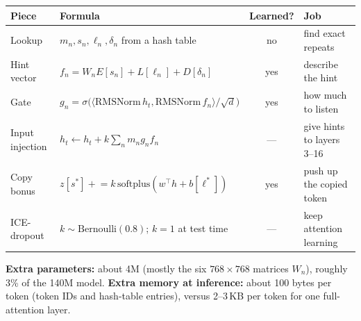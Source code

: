 \documentclass[11pt]{article}
\newcommand{\norm}{\mathrm{RMSNorm}}
\begin{document}
\begin{center}
\renewcommand{\arraystretch}{1.25}\small
\begin{tabular}{@{}llcl@{}}
\toprule
Piece & Formula & Learned? & Job \\
\midrule
Lookup & $m_n, s_n, \ell_n, \delta_n$ from a hash table & no & find exact repeats \\
Hint vector & $f_n = W_n E[s_n] + L[\ell_n] + D[\delta_n]$ & yes & describe the hint \\
Gate & $g_n = \sigma\big(\langle \norm\, h_t, \norm\, f_n \rangle / \sqrt d\big)$ & yes & how much to listen \\
Input injection & $h_t \leftarrow h_t + k \sum_n m_n g_n f_n$ & --- & give hints to layers 3--16 \\
Copy bonus & $z[s^*] \mathrel{+}= k\, \mathrm{softplus}(w^\top h + b[\ell^*])$ & yes & push up the copied token \\
ICE-dropout & $k \sim \mathrm{Bernoulli}(0.8)$; $k = 1$ at test time & --- & keep attention learning \\
\bottomrule
\end{tabular}
\end{center}

\textbf{Extra parameters:} about 4M (mostly the six $768 \times 768$ matrices $W_n$), roughly 3\% of the 140M model.
\textbf{Extra memory at inference:} about 100 bytes per token (token IDs and hash-table entries), versus 2--3\,KB per token for one full-attention layer.
\end{document}
